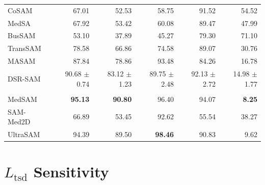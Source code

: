 \documentclass[10pt]{article}
\begin{document}
{\begin{longtable}{lrrrrr}
CoSAM & 67.01 & 52.53 & 58.75 & 91.52 & 54.52 \\
MedSA & 67.92 & 53.42 & 60.08 & 89.47 & 47.99 \\
BusSAM & 53.10 & 37.89 & 45.27 & 79.30 & 71.10 \\
TransSAM & 78.58 & 66.86 & 74.58 & 89.07 & 30.76 \\
MASAM & 87.84 & 78.86 & 93.48 & 84.26 & 16.78 \\
DSR-SAM & 90.68 $\pm$ 0.74 & 83.12 $\pm$ 1.23 & 89.75 $\pm$ 2.48 & 92.13 $\pm$ 2.72 & 14.98 $\pm$ 1.77 \\
\addlinespace[2pt]
\multicolumn{6}{l}{\textit{Zero-shot foundation models}} \\
MedSAM & \textbf{95.13} & \textbf{90.80} & 96.40 & 94.07 & \textbf{8.25} \\
SAM-Med2D & 66.89 & 53.45 & 92.62 & 55.54 & 38.27 \\
UltraSAM & 94.39 & 89.50 & \textbf{98.46} & 90.83 & 9.62 \\
\end{longtable}
}

\newpage

\section{$L_{\mathrm{tsd}}$ Sensitivity}
\label{sec:ltsd_sensitivity}
\end{document}
